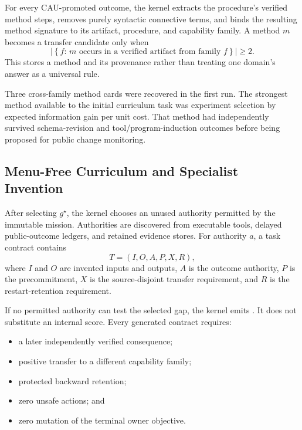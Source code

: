 For every CAU-promoted outcome, the kernel extracts the procedure's verified
method steps, removes purely syntactic connective terms, and binds the resulting
method signature to its artifact, procedure, and capability family.  A method
$m$ becomes a transfer candidate only when
\begin{equation}
\left|\left\{f:\,m\text{ occurs in a verified artifact from family }f\right\}\right|
\geq 2.
\label{eq:method-transfer-card}
\end{equation}
This stores a method and its provenance rather than treating one domain's
answer as a universal rule.

Three cross-family method cards were recovered in the first run.  The strongest
method available to the initial curriculum task was experiment selection by
expected information gain per unit cost.  That method had independently
survived schema-revision and tool/program-induction outcomes before being
proposed for public change monitoring.

\subsection{Menu-Free Curriculum and Specialist Invention}
\label{subsec:menu-free-apprentice-curriculum}

After selecting $g^{\star}$, the kernel chooses an unused authority permitted
by the immutable mission.  Authorities are discovered from executable tools,
delayed public-outcome ledgers, and retained evidence stores.  For authority
$a$, a task contract contains
\begin{equation}
T=(I,O,A,P,X,R),
\end{equation}
where $I$ and $O$ are invented inputs and outputs, $A$ is the outcome authority,
$P$ is the precommitment, $X$ is the source-disjoint transfer requirement, and
$R$ is the restart-retention requirement.

If no permitted authority can test the selected gap, the kernel emits
.  It does not substitute an internal
score.  Every generated contract requires:
\begin{itemize}
    \item a later independently verified consequence;
    \item positive transfer to a different capability family;
    \item protected backward retention;
    \item zero unsafe actions; and
    \item zero mutation of the terminal owner objective.
\end{itemize}

